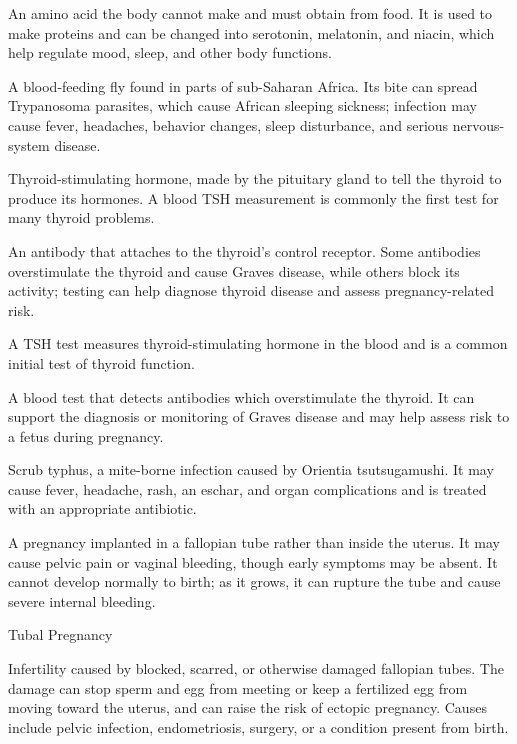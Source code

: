  An amino acid the body cannot make and must obtain from food. It is used to make proteins and can be changed into serotonin, melatonin, and niacin, which help regulate mood, sleep, and other body functions.

 A blood-feeding fly found in parts of sub-Saharan Africa. Its bite can spread Trypanosoma parasites, which cause African sleeping sickness; infection may cause fever, headaches, behavior changes, sleep disturbance, and serious nervous-system disease.

 Thyroid-stimulating hormone, made by the pituitary gland to tell the thyroid to produce its hormones. A blood TSH measurement is commonly the first test for many thyroid problems.

 An antibody that attaches to the thyroid’s control receptor. Some antibodies overstimulate the thyroid and cause Graves disease, while others block its activity; testing can help diagnose thyroid disease and assess pregnancy-related risk.

 A TSH test measures thyroid-stimulating hormone in the blood and is a common initial test of thyroid function.

 A blood test that detects antibodies which overstimulate the thyroid. It can support the diagnosis or monitoring of Graves disease and may help assess risk to a fetus during pregnancy.

 Scrub typhus, a mite-borne infection caused by Orientia tsutsugamushi. It may cause fever, headache, rash, an eschar, and organ complications and is treated with an appropriate antibiotic.

 A pregnancy implanted in a fallopian tube rather than inside the uterus. It may cause pelvic pain or vaginal bleeding, though early symptoms may be absent. It cannot develop normally to birth; as it grows, it can rupture the tube and cause severe internal bleeding.

\synonyms
Tubal Pregnancy

 Infertility caused by blocked, scarred, or otherwise damaged fallopian tubes. The damage can stop sperm and egg from meeting or keep a fertilized egg from moving toward the uterus, and can raise the risk of ectopic pregnancy. Causes include pelvic infection, endometriosis, surgery, or a condition present from birth.

